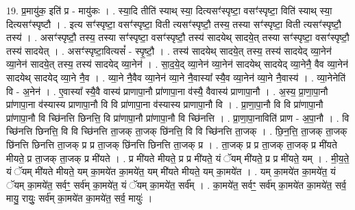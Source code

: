\documentclass[17pt]{extarticle}
\begin{document}
19. प्र॒मायु॑क॒ इति॑ प्र - मायु॑कः । . स्या॒दि तीति॑ स्याथ् स्या॒ दित्यसꣳ॑स्पृष्टा॒ वसꣳ॑स्पृष्टा॒ विति॑ स्याथ् स्या॒ दित्यसꣳ॑स्पृष्टौ । . इत्य सꣳ॑स्पृष्टा॒ वसꣳ॑स्पृष्टा॒ विती त्यसꣳ॑स्पृष्टौ॒ तस्य॒ तस्या सꣳ॑स्पृष्टा॒ विती
त्यसꣳ॑स्पृष्टौ॒ तस्य॑ । . असꣳ॑स्पृष्टौ॒ तस्य॒ तस्या सꣳ॑स्पृष्टा॒ वसꣳ॑स्पृष्टौ॒ तस्य॑ सादयेथ् सादये॒त् तस्या सꣳ॑स्पृष्टा॒ वसꣳ॑स्पृष्टौ॒ तस्य॑ सादयेत् । . असꣳ॑स्पृष्टा॒वित्यसं᳚ - स्पृ॒ष्टौ॒ । . तस्य॑ सादयेथ् सादये॒त् तस्य॒ तस्य॑ सादयेद् व्या॒नेन॑ व्या॒नेन॑ सादये॒त् तस्य॒ तस्य॑ सादयेद् व्या॒नेन॑ । . सा॒द॒ये॒द् व्या॒नेन॑ व्या॒नेन॑ सादयेथ् सादयेद् व्या॒नेनै॒ वैव व्या॒नेन॑ सादयेथ् सादयेद् व्या॒ने नै॒व । . व्या॒ने नै॒वैव व्या॒नेन॑ व्या॒ने नै॒वास्या᳚ स्यै॒व व्या॒नेन॑ व्या॒ने नै॒वास्य॑ । . व्या॒नेनेति॑ वि - अ॒नेन॑ । . ए॒वास्या᳚ स्यै॒वै वास्य॑ प्राणापा॒नौ प्रा॑णापा॒ना व॑स्यै॒ वैवास्य॑ प्राणापा॒नौ । . अ॒स्य॒ प्रा॒णा॒पा॒नौ प्रा॑णापा॒ना व॑स्यास्य प्राणापा॒नौ वि वि प्रा॑णापा॒ना व॑स्यास्य प्राणापा॒नौ वि । . प्रा॒णा॒पा॒नौ वि वि प्रा॑णापा॒नौ प्रा॑णापा॒नौ वि च्छि॑नत्ति छिनत्ति॒ वि प्रा॑णापा॒नौ प्रा॑णापा॒नौ वि च्छि॑नत्ति । . प्रा॒णा॒पा॒नाविति॑ प्राण - अ॒पा॒नौ । . वि च्छि॑नत्ति छिनत्ति॒ वि वि च्छि॑नत्ति ता॒जक् ता॒जक् छि॑नत्ति॒ वि वि च्छि॑नत्ति ता॒जक् । . छि॒न॒त्ति॒ ता॒जक् ता॒जक् छि॑नत्ति छिनत्ति ता॒जक् प्र प्र ता॒जक् छि॑नत्ति छिनत्ति ता॒जक् प्र । . ता॒जक् प्र प्र ता॒जक् ता॒जक् प्र मी॑यते मीयते॒ प्र ता॒जक् ता॒जक् प्र मी॑यते । . प्र मी॑यते मीयते॒ प्र प्र मी॑यते॒ यं ॅयम् मी॑यते॒ प्र प्र मी॑यते॒ यम् । . मी॒य॒ते॒ यं ॅयम् मी॑यते मीयते॒ यम् का॒मये॑त का॒मये॑त॒ यम् मी॑यते मीयते॒ यम् का॒मये॑त । . यम् का॒मये॑त का॒मये॑त॒ यं ॅयम् का॒मये॑त॒ सर्वꣳ॒॒ सर्व॑म् का॒मये॑त॒ यं ॅयम् का॒मये॑त॒ सर्व᳚म् । . का॒मये॑त॒ सर्वꣳ॒॒ सर्व॑म् का॒मये॑त का॒मये॑त॒ सर्व॒ मायु॒ रायुः॒ सर्व॑म् का॒मये॑त का॒मये॑त॒ सर्व॒ मायुः॑ । \newline
\end{document}
